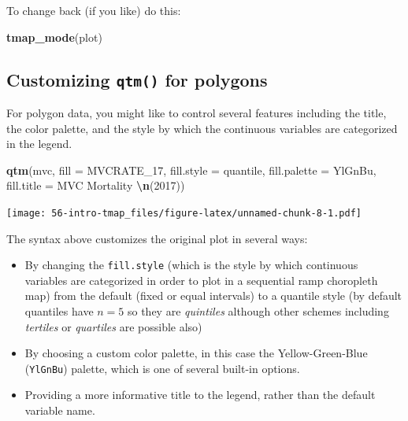 \documentclass[
]{book}
\newenvironment{Shaded}{\begin{snugshade}}{\end{snugshade}}
\newcommand{\AttributeTok}[1]{\textcolor[rgb]{0.13,0.29,0.53}{#1}}
\newcommand{\FunctionTok}[1]{\textcolor[rgb]{0.13,0.29,0.53}{\textbf{#1}}}
\newcommand{\NormalTok}[1]{#1}
\newcommand{\SpecialCharTok}[1]{\textcolor[rgb]{0.81,0.36,0.00}{\textbf{#1}}}
\newcommand{\StringTok}[1]{\textcolor[rgb]{0.31,0.60,0.02}{#1}}
\providecommand{\tightlist}{%
  \setlength{\itemsep}{0pt}\setlength{\parskip}{0pt}}
\begin{document}
To change back (if you like) do this:

\begin{Shaded}
\begin{Highlighting}[]
\FunctionTok{tmap\_mode}\NormalTok{(}\StringTok{\textquotesingle{}plot\textquotesingle{}}\NormalTok{)}
\end{Highlighting}
\end{Shaded}

\hypertarget{customizing-qtm-for-polygons}{%
\subsection{\texorpdfstring{Customizing \texttt{qtm()} for polygons}{Customizing qtm() for polygons}}\label{customizing-qtm-for-polygons}}

For polygon data, you might like to control several features including the title, the color palette, and the style by which the continuous variables are categorized in the legend.

\begin{Shaded}
\begin{Highlighting}[]
\FunctionTok{qtm}\NormalTok{(mvc,}
    \AttributeTok{fill =} \StringTok{\textquotesingle{}MVCRATE\_17\textquotesingle{}}\NormalTok{, }
    \AttributeTok{fill.style =} \StringTok{\textquotesingle{}quantile\textquotesingle{}}\NormalTok{, }
    \AttributeTok{fill.palette =} \StringTok{\textquotesingle{}YlGnBu\textquotesingle{}}\NormalTok{,}
    \AttributeTok{fill.title =} \StringTok{\textquotesingle{}MVC Mortality }\SpecialCharTok{\textbackslash{}n}\StringTok{(2017)\textquotesingle{}}\NormalTok{)}
\end{Highlighting}
\end{Shaded}

\texttt{[image: 56-intro-tmap\_files/figure-latex/unnamed-chunk-8-1.pdf]}

The syntax above customizes the original plot in several ways:

\begin{itemize}
\tightlist
\item
  By changing the \texttt{fill.style} (which is the style by which continuous variables are categorized in order to plot in a sequential ramp choropleth map) from the default (fixed or equal intervals) to a quantile style (by default quantiles have \(n=5\) so they are \emph{quintiles} although other schemes including \emph{tertiles} or \emph{quartiles} are possible also)
\item
  By choosing a custom color palette, in this case the Yellow-Green-Blue (\texttt{YlGnBu}) palette, which is one of several built-in options.
\item
  Providing a more informative title to the legend, rather than the default variable name.
\end{itemize}
\end{document}
